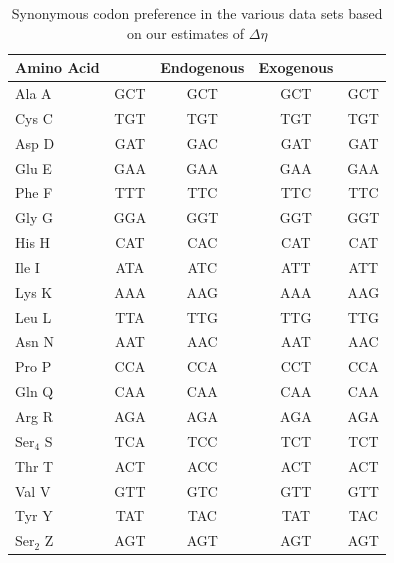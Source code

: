 \documentclass[12pt]{article}
\begin{document}
\begin{table}
    \centering
\begin{tabular}{  l  c  c  c  c  }
\hline
	Amino Acid & \gossypii & Endogenous & Exogenous & \kluyveri \\ \hline \hline
	Ala A & GCT & GCT & GCT & GCT \\ \hline
	Cys C & TGT & TGT & TGT & TGT \\ \hline
	Asp D & GAT & GAC & GAT & GAT \\ \hline
	Glu E & GAA & GAA & GAA & GAA \\ \hline
	Phe F & TTT & TTC & TTC & TTC \\ \hline
	Gly G & GGA & GGT & GGT & GGT \\ \hline
	His H & CAT & CAC & CAT & CAT \\ \hline
	Ile I & ATA & ATC & ATT & ATT \\ \hline
	Lys K & AAA & AAG & AAA & AAG \\ \hline
	Leu L & TTA & TTG & TTG & TTG \\ \hline
	Asn N & AAT & AAC & AAT & AAC \\ \hline
	Pro P & CCA & CCA & CCT & CCA \\ \hline
	Gln Q & CAA & CAA & CAA & CAA \\ \hline
	Arg R & AGA & AGA & AGA & AGA \\ \hline
	Ser$_4$ S & TCA & TCC & TCT & TCT \\ \hline
	Thr T & ACT & ACC & ACT & ACT \\ \hline
	Val V & GTT & GTC & GTT & GTT \\ \hline
	Tyr Y & TAT & TAC & TAT & TAC \\ \hline
	Ser$_2$ Z & AGT & AGT & AGT & AGT \\ \hline
\end{tabular}
    \caption{Synonymous codon preference in the various data sets based on our estimates of $\Delta \eta$}
    \label{tab:codon_pref_deta}
\end{table}

\clearpage
\end{document}
